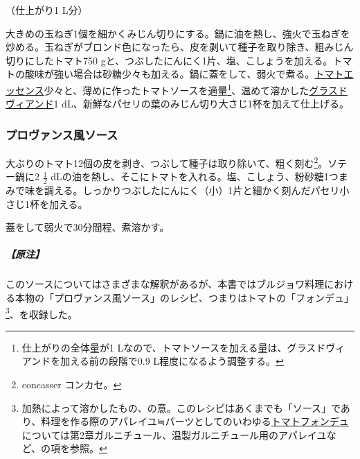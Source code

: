 \begin{recette}


（仕上がり1 L分）

大きめの玉ねぎ1個を細かくみじん切りにする。鍋に油を熱し、強火で玉ねぎを炒める。玉ねぎがブロンド色になったら、皮を剥いて種子を取り除き、粗みじん切りにしたトマト750
gと、つぶしたにんにく1片、塩、こしょうを加える。トマトの酸味が強い場合は砂糖少々も加える。鍋に蓋をして、弱火で煮る。\protect\hyperlink{essence-de-tomate}{トマトエッセンス}少々と、薄めに作ったトマトソースを適量\footnote{仕上がりの全体量が1
  Lなので、トマトソースを加える量は、グラスドヴィアンドを加える前の段階で0.9
  L程度になるよう調整する。}、温めて溶かした\protect\hyperlink{glace-de-viande}{グラスドヴィアンド}1
dL、新鮮なパセリの葉のみじん切り大さじ1杯を加えて仕上げる。

\hypertarget{sauce-provencale}{%
\subsubsection{プロヴァンス風ソース}\label{sauce-provencale}}



大ぶりのトマト12個の皮を剥き、つぶして種子は取り除いて、粗く刻む\footnote{concasser
  コンカセ。}。ソテー鍋に2 \(\frac{1}{2}\)
dLの油を熱し、そこにトマトを入れる。塩、こしょう、粉砂糖1つまみで味を調える。しっかりつぶしたにんにく（小）1片と細かく刻んだパセリ小さじ1杯を加える。

蓋をして弱火で30分間程、煮溶かす。

\hypertarget{nota-sauce-provencale}{%
\subparagraph{【原注】}\label{nota-sauce-provencale}}

このソースについてはさまざまな解釈があるが、本書ではブルジョワ料理における本物の「プロヴァンス風ソース」のレシピ、つまりはトマトの「フォンデュ」\footnote{加熱によって溶かしたもの、の意。このレシピはあくまでも「ソース」であり、料理を作る際のアパレイユ≒パーツとしてのいわゆる\protect\hyperlink{portugaise}{トマトフォンデュ}については第2章ガルニチュール、温製ガルニチュール用のアパレイユなど、の項を参照。}、を収録した。


\end{recette}
